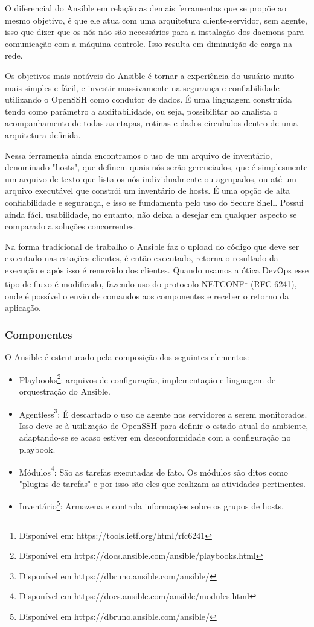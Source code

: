 O diferencial do Ansible em relação as demais ferramentas que se propõe ao mesmo objetivo, é que ele atua com uma arquitetura cliente-servidor, sem agente,  isso que dizer que os nós não são necessários para a instalação dos daemons para comunicação com a máquina controle. Isso resulta em diminuição de carga na rede. 

Os objetivos mais notáveis do Ansible é tornar a experiência do usuário muito mais simples e fácil, e investir massivamente na segurança e confiabilidade utilizando o OpenSSH como condutor de dados. É uma linguagem construída tendo como parâmetro a auditabilidade, ou seja, possibilitar ao analista o acompanhamento de todas as etapas, rotinas e dados circulados dentro de uma arquitetura definida.\cite{marcelocosta}

Nessa ferramenta ainda encontramos o uso de um arquivo de inventário, denominado "hosts", que definem quais nós serão gerenciados, que é simplesmente um arquivo de texto que lista os nós individualmente ou agrupados, ou até um arquivo executável que constrói um inventário de hosts. É uma opção de alta confiabilidade e segurança, e isso se fundamenta pelo uso do Secure Shell. Possui ainda fácil usabilidade, no entanto, não deixa a desejar em qualquer aspecto se comparado a soluções concorrentes.

Na forma tradicional de trabalho o Ansible faz o upload do código que deve ser executado nas estações clientes, é então executado, retorna o resultado da execução e após isso é removido dos clientes. Quando usamos a ótica DevOps esse tipo de fluxo é modificado, fazendo uso do protocolo NETCONF\footnote{Disponível em: https://tools.ietf.org/html/rfc6241} (RFC 6241), onde é possível o envio de comandos aos componentes e receber o retorno da aplicação.

\subsubsection{Componentes}
O Ansible é estruturado pela composição dos seguintes elementos:

\begin{itemize}
	\item Playbooks\footnote{Disponível em https://docs.ansible.com/ansible/playbooks.html}: arquivos de configuração, implementação e linguagem de orquestração do Ansible.
	\item Agentless\footnote{Disponível em https://dbruno.ansible.com/ansible/}: É descartado o uso de agente nos servidores a serem monitorados. Isso deve-se à utilização de OpenSSH para definir o estado atual do ambiente, adaptando-se se acaso estiver em desconformidade com a configuração no playbook.
	\item Módulos\footnote{Disponível em https://docs.ansible.com/ansible/modules.html}: São as tarefas executadas de fato. Os módulos são ditos como "plugins de tarefas" e por isso são eles que realizam as atividades pertinentes.
	\item Inventário\footnote{Disponível em https://dbruno.ansible.com/ansible/}: Armazena e controla informações sobre os grupos de hosts.
\end{itemize}

